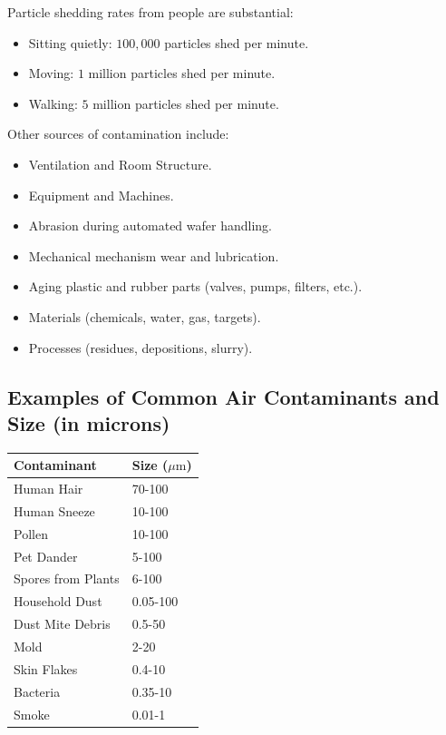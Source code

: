 \documentclass{report}
\begin{document}
Particle shedding rates from people are substantial:
\begin{itemize}
    \item Sitting quietly: $100,000$ particles shed per minute.
    \item Moving: $1$ million particles shed per minute.
    \item Walking: $5$ million particles shed per minute.
\end{itemize}
Other sources of contamination include:
\begin{itemize}
    \item Ventilation and Room Structure.
    \item Equipment and Machines.
    \item Abrasion during automated wafer handling.
    \item Mechanical mechanism wear and lubrication.
    \item Aging plastic and rubber parts (valves, pumps, filters, etc.).
    \item Materials (chemicals, water, gas, targets).
    \item Processes (residues, depositions, slurry).
\end{itemize}

\subsection{Examples of Common Air Contaminants and Size (in microns)}
\begin{center}
\begin{tabular}{|l|l|}
\hline
\textbf{Contaminant} & \textbf{Size ($\mu \text{m}$)} \\
\hline
Human Hair & 70-100 \\
Human Sneeze & 10-100 \\
Pollen & 10-100 \\
Pet Dander & 5-100 \\
Spores from Plants & 6-100 \\
Household Dust & 0.05-100 \\
Dust Mite Debris & 0.5-50 \\
Mold & 2-20 \\
Skin Flakes & 0.4-10 \\
Bacteria & 0.35-10 \\
Smoke & 0.01-1 \\
\hline
\end{tabular}
\end{center}
\end{document}
